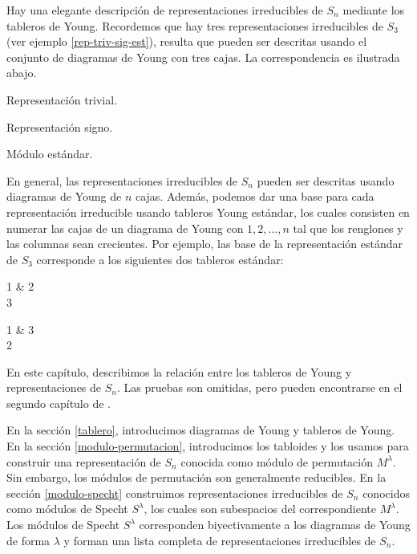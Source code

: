 \documentclass[12pt]{book}
\theoremstyle{definition}
\newcounter{in}
\newcounter{ini}
\begin{document}
Hay una elegante descripción de representaciones irreducibles de
$S_{n}$ mediante los tableros de Young. Recordemos que hay tres representaciones irreducibles de
$S_{3}$ (ver ejemplo \ref{rep-triv-sig-est}), resulta que pueden ser descritas usando el conjunto de diagramas de
Young con tres cajas. La correspondencia es ilustrada abajo.

\begin{center}
  \begin{minipage}[h]{0.3\linewidth}
    \centering

    Representación trivial.
  \end{minipage}
  \begin{minipage}[h]{0.3\linewidth}
    \centering

    Representación signo.
  \end{minipage}
  \begin{minipage}[h]{0.3\linewidth}
    \centering

    Módulo estándar.
  \end{minipage}
\end{center}

En general, las representaciones irreducibles de $S_{n}$ pueden ser
descritas usando diagramas de Young de $n$ cajas. Además, podemos dar
una base para cada representación irreducible usando tableros
Young estándar, los cuales consisten en numerar las cajas de un diagrama de
Young con $1,2,\ldots,n$ tal que los renglones y las columnas sean
crecientes. Por ejemplo, las base de la representación estándar de
$S_{3}$ corresponde a los siguientes dos tableros estándar:

\begin{center}
  \begin{ytableau}
    1 & 2\\
    3
  \end{ytableau} \qquad
  \begin{ytableau}
    1 & 3\\
    2
  \end{ytableau}
\end{center}

En este capítulo, describimos la relación entre los tableros de Young
y representaciones de $S_{n}$. Las pruebas son omitidas, pero pueden
encontrarse en el segundo capítulo de \cite{sagan2001symmetric}.

En la sección \ref{tablero}, introducimos diagramas de Young y tableros
de Young. En la sección \ref{modulo-permutacion}, introducimos los
tabloides y los usamos para construir una representación de $S_{n}$
conocida como módulo de permutación $M^{\lambda}$. Sin embargo, los
módulos de permutación son generalmente reducibles. En la sección
\ref{modulo-specht} construimos representaciones irreducibles de
$S_{n}$ conocidos como módulos de Specht $S^{\lambda}$, los cuales son
subespacios del correspondiente $M^{\lambda}$. Los módulos de
Specht $S^{\lambda}$ corresponden biyectivamente a los diagramas de
Young de forma $\lambda$ y forman una lista completa de
representaciones irreducibles de $S_{n}$.
\end{document}
